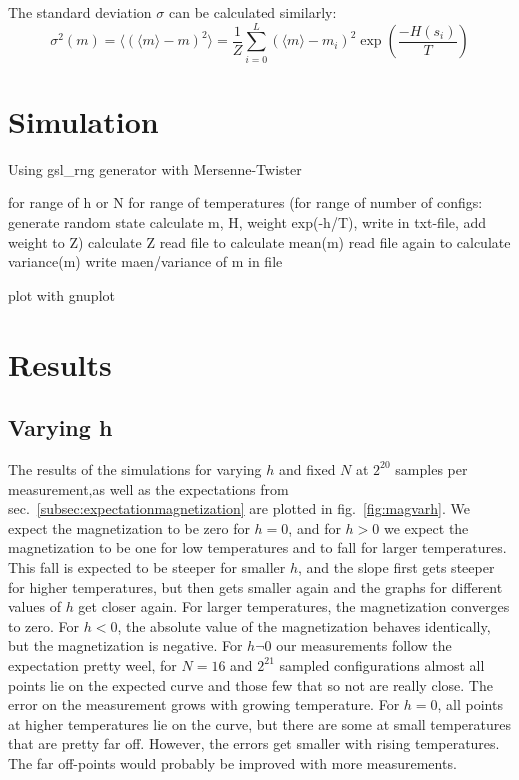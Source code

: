 \documentclass{scrartcl}
\begin{document}
The standard deviation $\sigma$ can be calculated similarly:
\[\sigma^2(m)=\langle(\langle m\rangle-m)^2\rangle=\frac{1}{Z}\sum_{i=0}^{L}(\langle m\rangle-m_i)^2\exp\left( \frac{-H(s_i)}{T}\right) \]



\section{Simulation}
Using gsl\_rng generator with Mersenne-Twister\cite{gsldoc}

for range of h or N
for range of temperatures
(for range of number of configs:
generate random state
calculate m, H, weight exp(-h/T), write in txt-file, add weight to Z)
calculate Z
read file to calculate mean(m)
read file again to calculate variance(m)
write maen/variance of m in file

plot with gnuplot

\section{Results}
\label{sec:results}
\subsection{Varying h}
The results of the simulations for varying $h$ and fixed $N$ at $2^{20}$ samples per measurement,as well as the expectations from sec.~\ref{subsec:expectationmagnetization} are plotted in fig.~\ref{fig:magvarh}. We expect the magnetization to be zero for $h=0$, and for $h>0$ we expect the magnetization to be one for  low temperatures and to fall for larger temperatures. This fall is expected to be steeper for smaller $h$, and the slope first gets steeper for higher temperatures, but then gets smaller again and the graphs for different values of $h$ get closer again. For larger temperatures, the magnetization converges to zero. For $h<0$, the absolute value of the magnetization behaves identically, but the magnetization is negative. For $h\neg 0$ our measurements follow the expectation pretty weel, for $N=16$ and $2^{21}$ sampled configurations almost all points lie on the expected curve and those few that so not are really close. The error on the measurement grows with growing temperature. For $h=0$, all points at higher temperatures lie on the curve, but there are some at small temperatures that are pretty far off. However, the errors get smaller with rising temperatures. The far off-points would probably be improved with more measurements.
\end{document}
